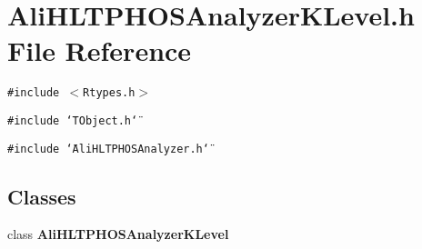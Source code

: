 \section{Ali\-HLTPHOSAnalyzer\-KLevel.h File Reference}
\label{AliHLTPHOSAnalyzerKLevel_8h}
{\tt \#include $<$Rtypes.h$>$}\par
{\tt \#include \char`\"{}TObject.h\char`\"{}}\par
{\tt \#include \char`\"{}Ali\-HLTPHOSAnalyzer.h\char`\"{}}\par
\subsection*{Classes}
\begin{CompactItemize}
\item 
class {\bf Ali\-HLTPHOSAnalyzer\-KLevel}
\end{CompactItemize}
